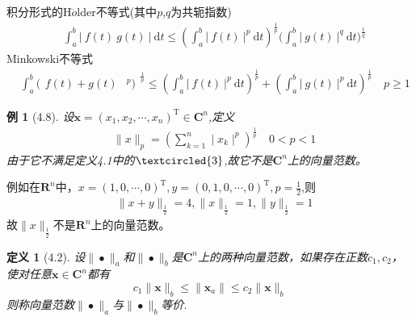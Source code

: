 \documentclass{sintefbeamer}[dark]
\newtheorem*{定义}{定义}
\newtheorem*{例}{例}
\begin{document}
	\begin{frame}
		积分形式的H$\ddot{o}$lder不等式(其中$p$,$q$为共轭指数)
		\begin{equation*}
			\begin{aligned}
				&\int_a^b\big|\:f(t)\:g(t)\:\big|\:\mathrm{d}t\leqslant(\int_a^b\big|\:f(t)\:\big|^p\:\mathrm{d}t)^{\frac{1}{p}}\big(\int_a^b\big|\:g(t)\:\big|^q\:\mathrm{d}t\big)^{\frac{1}{q}}
			\end{aligned}
		\end{equation*} 
		Minkowski不等式
		\begin{equation*}
			\begin{aligned}
				&\int_{a}^{b}(\begin{array}{c|c|c}f(t)+g(t)&^{p})\end{array}^{\frac{1}{p}}\leqslant(\int_{a}^{b}\bigg|\:f(t)\:\bigg|^{p}\:\mathrm{d}t)^{\frac{1}{p}}+(\int_{a}^{b}\bigg|\:g(t)\:\bigg|^{p}\:\mathrm{d}t)^{\frac{1}{p}}\quad p\geqslant1
			\end{aligned}
		\end{equation*} 
\end{frame}

\begin{frame}
	\begin{例}[4.8]
		设$\boldsymbol{x}=(x_1,x_2,\cdots,x_n)^{\mathrm{T}}\in\mathbf{C}^n$,定义
		\begin{equation*}
			\begin{aligned}
				&\parallel x\parallel_p=(\sum_{k=1}^n\mid x_k\mid^p)^{\frac{1}{p}}\quad0<p<1
			\end{aligned}
		\end{equation*}
		由于它不满足定义4.1中的$\textcircled{3}$,故它不是$\mathbf{C}^n$上的向量范数。
	\end{例}
		例如在$\mathbf{R}^n$中，$x=(1,0,\cdots,0)^{\mathrm{T}},y=(0,1,0,\cdots,0)^{\mathrm{T}},p=\frac{1}{2}$,则
        \begin{equation*}
			\begin{aligned}
				&\parallel x+y\parallel_{\frac12}=4,\parallel x\parallel_{\frac12}=1,\parallel y\parallel_{\frac12}=1
			\end{aligned}
		\end{equation*}
		故$\parallel x\parallel_{\frac12}$不是$\mathbf{R}^n$上的向量范数。
\end{frame}

\begin{frame}
	\begin{定义}[4.2]
		设$\|\bullet\|_{a}$和$\|\bullet\|_{b}$是$\mathbf{C}^{n}$上的两种向量范数，如果存在正数$c_{1},c_{2}$，使对任意$\bm{x}\in\mathbf{C}^{n}$都有
		$$
		c_{1}\|\bm{x}\|_{b}\le\|\bm{x}_{a}\|\le c_{2}\|\bm{x}\|_{b}
		$$
		\linebreak
		则称向量范数$\|\bullet\|_{a}$与$\|\bullet\|_{b}$等价.
		\end{定义}
\end{frame}
\end{document}
